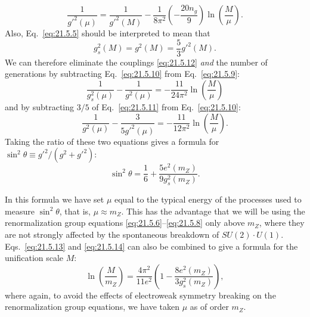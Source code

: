 \begin{equation}
\frac{1}{g'^2(\mu)}
=\frac{1}{g'^2(M)}
-\frac{1}{8\pi^2}
\left(-\frac{20n_g}{9}\right)
\ln\left(\frac{M}{\mu}\right).
\tag{21.5.11}\label{eq:21.5.11}
\end{equation}
Also, Eq.~\eqref{eq:21.5.5} should be interpreted to mean that
\begin{equation}
g_s^2(M)=g^2(M)=\frac{5}{3}g'^2(M).
\tag{21.5.12}\label{eq:21.5.12}
\end{equation}
We can therefore eliminate the couplings \eqref{eq:21.5.12} \emph{and} the number of generations by subtracting Eq.~\eqref{eq:21.5.10} from Eq.~\eqref{eq:21.5.9}:
\begin{equation}
\frac{1}{g_s^2(\mu)}-\frac{1}{g^2(\mu)}
=-\frac{11}{24\pi^2}\ln\left(\frac{M}{\mu}\right)
\tag{21.5.13}\label{eq:21.5.13}
\end{equation}
and by subtracting $3/5$ of Eq.~\eqref{eq:21.5.11} from Eq.~\eqref{eq:21.5.10}:
\begin{equation}
\frac{1}{g^2(\mu)}-\frac{3}{5g'^2(\mu)}
=-\frac{11}{12\pi^2}\ln\left(\frac{M}{\mu}\right).
\tag{21.5.14}\label{eq:21.5.14}
\end{equation}
Taking the ratio of these two equations gives a formula for $\sin^2\theta\equiv g'^2/(g^2+g'^2)$:
\begin{equation}
\sin^2\theta
=\frac{1}{6}
+\frac{5e^2(m_Z)}{9g_s^2(m_Z)}.
\tag{21.5.15}\label{eq:21.5.15}
\end{equation}

In this formula we have set $\mu$ equal to the typical energy of the processes used to measure $\sin^2\theta$, that is, $\mu\approx m_Z$. This has the advantage that we will be using the renormalization group equations \eqref{eq:21.5.6}--\eqref{eq:21.5.8} only above $m_Z$, where they are not strongly affected by the spontaneous breakdown of $SU(2)\cdot U(1)$. Eqs.~\eqref{eq:21.5.13} and \eqref{eq:21.5.14} can also be combined to give a formula for the unification scale $M$:
\begin{equation}
\ln\left(\frac{M}{m_Z}\right)
=\frac{4\pi^2}{11e^2}
\left(1-\frac{8e^2(m_Z)}{3g_s^2(m_Z)}\right),
\tag{21.5.16}\label{eq:21.5.16}
\end{equation}
where again, to avoid the effects of electroweak symmetry breaking on the renormalization group equations, we have taken $\mu$ as of order $m_Z$.

